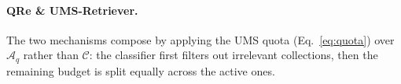 \paragraph{QRe \& UMS-Retriever.}
The two mechanisms compose by applying the UMS quota
(Eq.~\ref{eq:quota}) over $\mathcal{A}_q$ rather than $\mathcal{C}$:
the classifier first filters out irrelevant collections, then the remaining
budget is split equally across the active ones.



